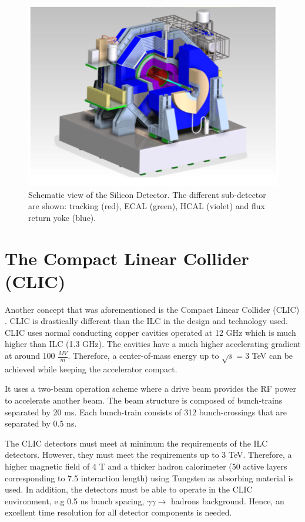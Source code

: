 \begin{figure}[htbp!]
  \centering
  \includegraphics[width=0.6\linewidth]{chap2/fig/SiD_Detector.png}
  \caption{Schematic view of the Silicon Detector. The different sub-detector are shown: tracking (red), ECAL (green), HCAL (violet) and flux return yoke (blue).\cite{ILC_TDR_Vol4}} \label{fig:SiD}
\end{figure}

\section{The Compact Linear Collider (CLIC)}

Another concept that was aforementioned is the Compact Linear Collider (CLIC) \cite{Aicheler:2012bya, CLIC_CDR}. CLIC is drastically different than the ILC in the design and technology used. CLIC uses normal conducting copper cavities operated at 12 GHz which is much higher than ILC (1.3 GHz). The cavities have a much higher accelerating gradient at around 100 $\frac{MV}{m}$. Therefore, a center-of-mass energy up to $\sqrt{s} = 3$ TeV can be achieved while keeping the accelerator compact.

It uses a two-beam operation scheme where a drive beam provides the RF power to accelerate another beam. The beam structure is composed of bunch-trains separated by 20 ms. Each bunch-train consists of 312 bunch-crossings that are separated by 0.5 ns.

The CLIC detectors must meet at minimum the requirements of the ILC detectors. However, they must meet the requirements up to 3 TeV. Therefore, a higher magnetic field of 4 T and a thicker hadron calorimeter (50 active layers corresponding to 7.5 interaction length) using Tungsten as absorbing material is used. In addition, the detectors must be able to operate in the CLIC environment, e.g 0.5 ns bunch spacing, $\gamma\gamma \rightarrow$ hadrons background. Hence, an excellent time resolution for all detector components is needed.

